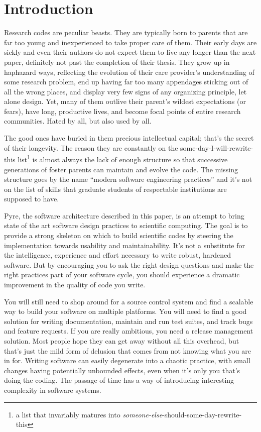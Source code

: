 %
%

\section{Introduction}
\label{sec:introduction}

Research codes are peculiar beasts. They are typically born to parents that are far too young
and inexperienced to take proper care of them. Their early days are sickly and even their
authors do not expect them to live any longer than the next paper, definitely not past the
completion of their thesis. They grow up in haphazard ways, reflecting the evolution of their
care provider's understanding of some research problem, end up having far too many appendages
sticking out of all the wrong places, and display very few signs of any organizing principle,
let alone design.  Yet, many of them outlive their parent's wildest expectations (or fears),
have long, productive lives, and become focal points of entire research communities. Hated by
all, but also used by all.

The good ones have buried in them precious intellectual capital; that's the secret of their
longevity. The reason they are constantly on the some-day-I-will-rewrite-this list\footnote{a
  list that invariably matures into {\em someone-else}-should-some-day-rewrite-this} is almost
always the lack of enough structure so that successive generations of foster parents can
maintain and evolve the code. The missing structure goes by the name ``modern software
engineering practices'' and it's not on the list of skills that graduate students of
respectable institutions are supposed to have.

Pyre, the software architecture described in this paper, is an attempt to bring state of the
art software design practices to scientific computing. The goal is to provide a strong skeleton
on which to build scientific codes by steering the implementation towards usability and
maintainability. It's not a substitute for the intelligence, experience and effort necessary to
write robust, hardened software. But by encouraging you to ask the right design questions and
make the right practices part of your software cycle, you should experience a dramatic
improvement in the quality of code you write.

You will still need to shop around for a source control system and find a scalable way to build
your software on multiple platforms. You will need to find a good solution for writing
documentation, maintain and run test suites, and track bugs and feature requests. If you are
really ambitious, you need a release management solution. Most people hope they can get away
without all this overhead, but that's just the mild form of delusion that comes from not
knowing what you are in for.  Writing software can easily degenerate into a chaotic practice,
with small changes having potentially unbounded effects, even when it's only you that's doing
the coding. The passage of time has a way of introducing interesting complexity in software
systems.


